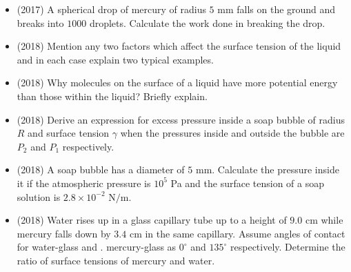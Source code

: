 \documentclass{article}
\begin{document}
\begin{itemize}
\begin{itemize}
\end{itemize}
\item (2017)  A spherical drop of mercury of radius $ 5$ mm falls on the ground and breaks into $ 1000$ droplets. Calculate the work done in breaking the drop. 
\item (2018)  Mention any two factors which affect the surface tension of the liquid and in each case explain two typical examples. 
\item (2018)  Why molecules on the surface of a liquid have more potential energy than those within the liquid? Briefly explain. 
\item (2018)  Derive an expression for excess pressure inside a soap bubble of radius $ R$ and surface tension $ \gamma $ when the pressures inside and outside the bubble are $ P_{2}$ and $ P_{1}$ respectively. 
\item (2018)  A soap bubble has a diameter of $ 5$ mm. Calculate the pressure inside it if the atmospheric pressure is $ 10^{5}$ Pa and the surface tension of a soap solution is $ 2.8 \times 10^{-2}$ N$/$m.
\item (2018)  Water rises up in a glass capillary tube up to a height of $ 9.0$ cm while mercury falls down by $ 3.4$ cm in the same capillary. Assume angles of contact for water-glass and . mercury-glass as $ 0^{\circ}$ and $ 135^{\circ}$ respectively. Determine the ratio of surface tensions of mercury and water. 
\end{itemize}
\end{document}
